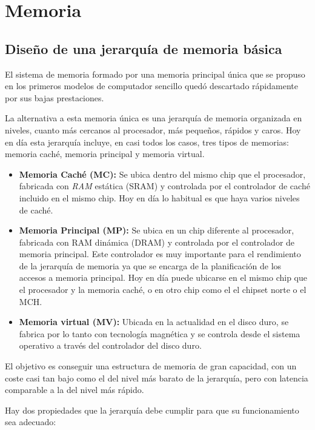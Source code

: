 \section{Memoria}\label{sec:memory}

\subsection{Diseño de una jerarquía de memoria básica}

El sistema de memoria formado por una memoria principal única que se propuso en los primeros modelos de computador sencillo quedó descartado rápidamente por sus bajas prestaciones.

La alternativa a esta memoria única es una jerarquía de memoria organizada en niveles, cuanto más cercanos al procesador, más pequeños, rápidos y caros. Hoy en día esta jerarquía incluye, en casi todos los casos, tres tipos de memorias: memoria caché, memoria principal y memoria virtual.

\begin{itemize}
  \item \textbf{Memoria Caché (MC):} Se ubica dentro del mismo chip que el procesador, fabricada con \textit{RAM} estática (SRAM) y controlada por el controlador de caché incluido en el mismo chip. Hoy en día lo habitual es que haya varios niveles de caché.
  \item \textbf{Memoria Principal (MP):} Se ubica en un chip diferente al procesador, fabricada con RAM dinámica (DRAM) y controlada por el controlador de memoria principal. Este controlador es muy importante para el rendimiento de la jerarquía de memoria ya que se encarga de la planificación de los accesos a memoria principal. Hoy en día puede ubicarse en el mismo chip que el procesador y la memoria caché, o en otro chip como el el chipset norte o el MCH.\@
  \item \textbf{Memoria virtual (MV):} Ubicada en la actualidad en el disco duro, se fabrica por lo tanto con tecnología magnética y se controla desde el sistema operativo a través del controlador del disco duro.
\end{itemize}

El objetivo es conseguir una estructura de memoria de gran capacidad, con un coste casi tan bajo como el del nivel más barato de la jerarquía, pero con latencia comparable a la del nivel más rápido.

Hay dos propiedades que la jerarquía debe cumplir para que su funcionamiento sea adecuado:


